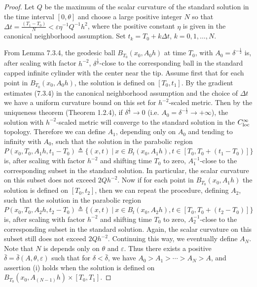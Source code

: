 \begin{proof}
Let $Q$ be the maximum of the scalar curvature of the standard
solution in the time interval $[0,\theta]$ and choose a large
positive integer $N$ so that $\Delta
t=\frac{(T_1-T_0)}{N}<\varepsilon\eta^{-1}Q^{-1}h^2$, where the
positive constant $\eta$ is given in the canonical neighborhood
assumption. Set $t_k=T_0+k\Delta t$, $k=0, 1, \ldots, N$.

{}From Lemma 7.3.4, the geodesic ball $B_{T_0}(x_0,A_0h)$ at time
$T_0$, with $A_0=\delta^{-\frac{1}{2}}$ is, after scaling with
factor $h^{-2}$, $\delta^{\frac{1}{2}}$-close to the corresponding
ball in the standard capped infinite cylinder with the center near
the tip. Assume first that for each point in $B_{T_0}(x_0,A_0h)$,
the solution is defined on $[T_0,t_1]$. By the gradient estimates
(7.3.4) in the canonical neighborhood assumption and the choice of
$\Delta t$ we have a uniform curvature bound on this set for
$h^{-2}$-scaled metric. Then by the uniqueness theorem (Theorem
1.2.4), if $\delta^{\frac{1}{2}}\rightarrow0$ (i.e.
$A_0=\delta^{-\frac{1}{2}} \rightarrow +\infty$), the solution
with $h^{-2}$-scaled metric will converge to the standard solution
in the $C^\infty_{\rm loc}$ topology. Therefore we can define
$A_1$, depending only on $A_0$ and tending to infinity with $A_0$,
such that the solution in the parabolic region
$P(x_0,T_0,A_1h,t_1-T_0)\triangleq\{(x,t)\ |\ x\in
B_t(x_0,A_1h),t\in[T_0,T_0+(t_1-T_0)]\}$ is, after scaling with
factor $h^{-2}$ and shifting time $T_0$ to zero, $A^{-1}_1$-close
to the corresponding subset in the standard solution. In
particular, the scalar curvature on this subset does not exceed
$2Qh^{-2}$. Now if for each point in $B_{T_0}(x_0,A_1h)$ the
solution is defined on $[T_0,t_2]$, then we can repeat the
procedure, defining $A_2$, such that the solution in the parabolic
region $P(x_0,T_0,A_2h,t_2-T_0)\triangleq\{(x,t)\ |\ x\in
B_t(x_0,A_2h),t\in[T_0,T_0+(t_2-T_0)]\}$ is, after scaling with
factor $h^{-2}$ and shifting time $T_0$ to zero, $A^{-1}_2$-close
to the corresponding subset in the standard solution. Again, the
scalar curvature on this subset still does not exceed $2Qh^{-2}$.
Continuing this way, we eventually define $A_N$. Note that $N$ is
depends only on $\theta$ and $\varepsilon$. Thus there exists a
positive $\bar{\delta}=\bar{\delta}(A,\theta,\varepsilon)$ such
that for $\delta<\bar{\delta}$, we have $A_0>A_1>\cdots>A_N>A$,
and assertion (i) holds when the solution is defined on
$B_{T_0}(x_0,A_{(N-1)}h)\times [T_0,T_1]$.


\end{proof}
